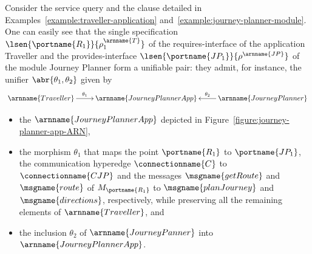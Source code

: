 \documentclass{LMCS}
\begin{document}
  \begin{exa}
    \label{example:service-oriented-resolution}
    Consider the service query and the clause detailed in Examples~\ref{example:traveller-application} and~\ref{example:journey-planner-module}.  One can easily see that the single specification \(\lsen{\portname{R_{1}}}{\rho^{\arnname{T}}_{1}}\) of the requires-interface of the application Traveller and the provides-interface \(\lsen{\portname{JP_{1}}}{\rho^{\arnname{JP}}}\) of the module Journey Planner form a unifiable pair: they admit, for instance, the unifier \(\abr{\theta_{1}, \theta_{2}}\) given by
    \[
    \xymatrix {
      {\arnname{Traveller}}
      \ar [r] ^-{\theta_{1}} 
      & {\arnname{JourneyPlannerApp}}
      & {\arnname{JourneyPlanner}}
      \ar [l] _-{\theta_{2}}
    }
    \]
    \begin{itemize}
      
    \item the  \(\arnname{JourneyPlannerApp}\) depicted in Figure~\ref{figure:journey-planner-app-ARN},
      
    \item the morphism \(\theta_{1}\) that maps the point \(\portname{R_{1}}\) to \(\portname{JP_{1}}\), the communication hyperedge \(\connectionname{C}\) to \(\connectionname{CJP}\) and the messages \(\msgname{getRoute}\) and \(\msgname{route}\) of \(M_{\portname{R_{1}}}\) to \(\msgname{planJourney}\) and \(\msgname{directions}\), respectively, while preserving all the remaining elements of \(\arnname{Traveller}\), and

    \item the inclusion \(\theta_{2}\) of \(\arnname{JourneyPanner}\) into \(\arnname{JourneyPlannerApp}\).
      
    \end{itemize}
    
    \begin{figure}[h]
      \centering

\end{figure}
\end{exa}
\end{document}

